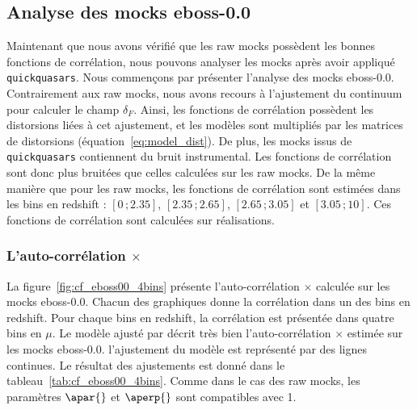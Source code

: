 \subsection{Analyse des mocks eboss-0.0}
\label{subsec:ana_eboss-0.0}
Maintenant que nous avons vérifié que les raw mocks possèdent les bonnes fonctions de corrélation, nous pouvons analyser les mocks après avoir appliqué \texttt{quickquasars}.
Nous commençons par présenter l'analyse des mocks eboss-0.0.
Contrairement aux raw mocks, nous avons recours à l'ajustement du continuum pour calculer le champ $\delta_F$. Ainsi, les fonctions de corrélation possèdent les distorsions liées à cet ajustement, et les modèles sont multipliés par les matrices de distorsions (équation~\ref{eq:model_dist}). De plus, les mocks issus de \texttt{quickquasars} contiennent du bruit instrumental. Les fonctions de corrélation sont donc plus bruitées que celles calculées sur les raw mocks.
De la même manière que pour les raw mocks, les fonctions de corrélation sont estimées dans les bins en redshift : $[\num{0}\,;\num{2.35}]$, $[\num{2.35}\,;\num{2.65}]$, $[\num{2.65}\,;\num{3.05}]$ et $[\num{3.05}\,;\num{10}]$. Ces fonctions de corrélation sont calculées sur \Nmocks{} réalisations.


\subsubsection{L'auto-corrélation \lya{}$\times$\lya{}}
La figure~\ref{fig:cf_eboss00_4bins} présente l'auto-corrélation \lya{}$\times$\lya{} calculée sur les mocks eboss-0.0. Chacun des graphiques donne la corrélation dans un des bins en redshift. Pour chaque bins en redshift, la corrélation est présentée dans quatre bins en $\mu$.
Le modèle ajusté par \picca{} décrit très bien l'auto-corrélation \lya{}$\times$\lya{} estimée sur les mocks eboss-0.0.
l'ajustement du modèle est représenté par des lignes continues. Le résultat des ajustements est donné dans le tableau~\ref{tab:cf_eboss00_4bins}. Comme dans le cas des raw mocks, les paramètres $\apar{}$ et $\aperp{}$ sont compatibles avec 1.

